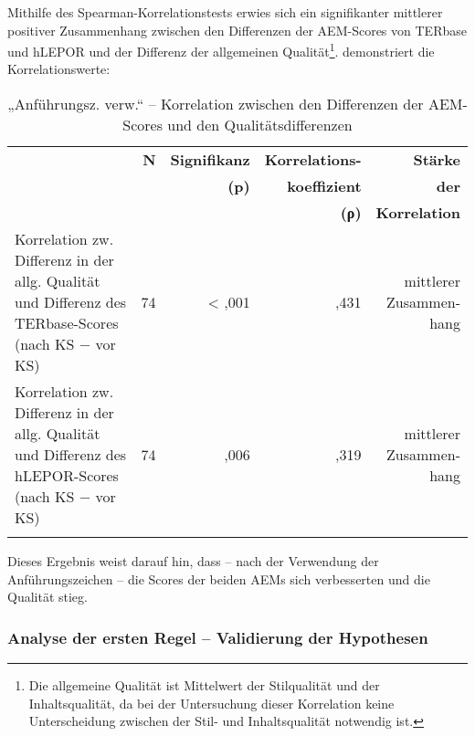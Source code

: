 
Mithilfe des Spearman-Korrelationstests erwies sich ein signifikanter mittlerer positiver Zusammenhang zwischen den Differenzen der AEM-Scores von TERbase und hLEPOR und der Differenz der allgemeinen Qualität\footnote{\textrm{Die allgemeine Qualität ist Mittelwert der Stilqualität und der Inhaltsqualität, da bei der Untersuchung dieser Korrelation keine Unterscheidung zwischen der Stil- und Inhaltsqualität notwendig ist.}}.  demonstriert die Korrelationswerte:


\begin{table}
\begin{tabularx}{\textwidth}{Xrrrr}
\lsptoprule
& \textbf{N} &  \textbf{Signifikanz} & \textbf{Korrelations-} & \textbf{Stärke}\\
& & \textbf{(p)} & \textbf{koeffizient} & \textbf{der}\\
& & & \textbf{(ρ)} & \textbf{Korrelation}\\
\midrule
Korrelation zw. Differenz in der allg. Qualität und Differenz des TERbase-Scores (nach KS $-$ vor KS) & 74 & < ,001 & ,431 & \makecell[tr]{mittlerer\\Zusammen-\\hang}\\
\tablevspace
Korrelation zw. Differenz in der allg. Qualität und Differenz des hLEPOR-Scores (nach KS $-$ vor KS) & { 74} & ,006 & ,319 & \makecell[tr]{mittlerer\\Zusammen-\\hang}\\
\lspbottomrule
\end{tabularx}
\caption{\label{tab:05:29} „Anführungsz. verw.“ -- Korrelation zwischen den Differenzen der AEM-Scores und den Qualitätsdifferenzen}
\end{table}

Dieses Ergebnis weist darauf hin, dass -- nach der Verwendung der Anführungszeichen -- die Scores der beiden AEMs sich verbesserten und die Qualität stieg.

\subsubsection{\label{sec:5.3.1.7}Analyse der ersten Regel -- Validierung der Hypothesen}

